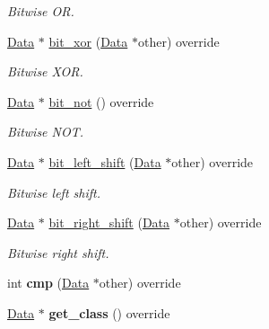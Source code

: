 \begin{DoxyCompactItemize}
\begin{DoxyCompactList}\small\item\em Bitwise OR. \end{DoxyCompactList}\item 
\hyperlink{classcreek_1_1_data}{Data} $\ast$ \hyperlink{classcreek_1_1_number_aa420a7dd7c2ec88f8ef8c5744fa98152}{bit\+\_\+xor} (\hyperlink{classcreek_1_1_data}{Data} $\ast$other) override\hypertarget{classcreek_1_1_number_aa420a7dd7c2ec88f8ef8c5744fa98152}{}\label{classcreek_1_1_number_aa420a7dd7c2ec88f8ef8c5744fa98152}

\begin{DoxyCompactList}\small\item\em Bitwise X\+OR. \end{DoxyCompactList}\item 
\hyperlink{classcreek_1_1_data}{Data} $\ast$ \hyperlink{classcreek_1_1_number_a7556f4c3f5a4094110c132e44dc0c67f}{bit\+\_\+not} () override\hypertarget{classcreek_1_1_number_a7556f4c3f5a4094110c132e44dc0c67f}{}\label{classcreek_1_1_number_a7556f4c3f5a4094110c132e44dc0c67f}

\begin{DoxyCompactList}\small\item\em Bitwise N\+OT. \end{DoxyCompactList}\item 
\hyperlink{classcreek_1_1_data}{Data} $\ast$ \hyperlink{classcreek_1_1_number_ab20a1f50ee758dedefb7f2b3861b03e3}{bit\+\_\+left\+\_\+shift} (\hyperlink{classcreek_1_1_data}{Data} $\ast$other) override\hypertarget{classcreek_1_1_number_ab20a1f50ee758dedefb7f2b3861b03e3}{}\label{classcreek_1_1_number_ab20a1f50ee758dedefb7f2b3861b03e3}

\begin{DoxyCompactList}\small\item\em Bitwise left shift. \end{DoxyCompactList}\item 
\hyperlink{classcreek_1_1_data}{Data} $\ast$ \hyperlink{classcreek_1_1_number_a2e4f85a0f60fa0efeb010d0599c0e192}{bit\+\_\+right\+\_\+shift} (\hyperlink{classcreek_1_1_data}{Data} $\ast$other) override\hypertarget{classcreek_1_1_number_a2e4f85a0f60fa0efeb010d0599c0e192}{}\label{classcreek_1_1_number_a2e4f85a0f60fa0efeb010d0599c0e192}

\begin{DoxyCompactList}\small\item\em Bitwise right shift. \end{DoxyCompactList}\item 
int {\bfseries cmp} (\hyperlink{classcreek_1_1_data}{Data} $\ast$other) override\hypertarget{classcreek_1_1_number_a4619847ae453d60d10ba448704d89a1f}{}\label{classcreek_1_1_number_a4619847ae453d60d10ba448704d89a1f}

\item 
\hyperlink{classcreek_1_1_data}{Data} $\ast$ {\bfseries get\+\_\+class} () override\hypertarget{classcreek_1_1_number_a8085f13ab4ff14812770e859c2a0ef99}{}\label{classcreek_1_1_number_a8085f13ab4ff14812770e859c2a0ef99}

\end{DoxyCompactItemize}


